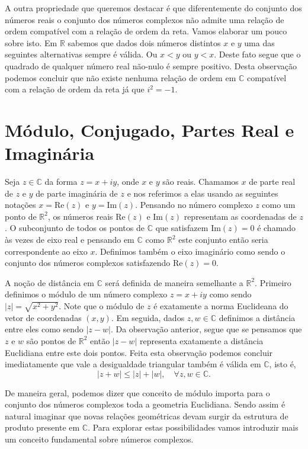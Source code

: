 A outra propriedade que queremos destacar é que diferentemente do conjunto dos números
reais o conjunto dos números complexos não admite uma relação de ordem compatível 
com a relação de ordem da reta. Vamos elaborar um pouco sobre isto. Em $\mathbb{R}$ 
sabemos que dados dois números distintos $x$ e $y$ uma das seguintes alternativas sempre é válida.
Ou $x<y$ ou $y<x$. Deste fato segue que o quadrado de qualquer número real não-nulo é sempre positivo.
Desta observação podemos concluir que não existe nenhuma relação de ordem 
em $\mathbb{C}$ compatível com a relação de ordem da reta já que $i^2=-1$. 


\section{Módulo, Conjugado, Partes Real e Imaginária}

Seja $z\in \mathbb{C}$ da forma $z=x+iy$, onde $x$ e $y$ são reais. 
Chamamos $x$ de parte real de $z$ e $y$ de parte imaginária de $z$ e nos referimos a elas 
usando as seguintes notações $x=\text{Re}(z)$ e $y=\text{Im}(z)$.
Pensando no número complexo $z$ como um ponto de $\mathbb{R}^2$, 
os números reais $\text{Re}(z)$ e $\text{Im}(z)$ representam as coordenadas de $z$.
O subconjunto de todos os pontos de $\mathbb{C}$ que satisfazem $\text{Im}(z)=0$ é
chamado às vezes de eixo real e pensando em $\mathbb{C}$ como $\mathbb{R}^2$
este conjunto então seria correspondente ao eixo $x$. Definimos também o eixo imaginário
como sendo o conjunto dos números complexos satisfazendo $\text{Re}(z)=0$. 

A noção de distância em $\mathbb{C}$ será definida de maneira semelhante a $\mathbb{R}^2$.
Primeiro definimos o módulo
 de um número complexo $z=x+iy$ como sendo $|z|=\sqrt{x^2+y^2}$.
Note que o módulo de $z$ é exatamente a norma Euclideana do vetor de coordenadas $(x,y)$.
Em seguida, dados $z,w\in\mathbb{C}$ definimos a distância entre eles como sendo $|z-w|$.
Da observação anterior, segue que se pensamos que $z$ e $w$ são pontos
de $\mathbb{R}^2$ então $|z-w|$ representa exatamente a distância Euclidiana entre este dois pontos. 
Feita esta observação podemos concluir imediatamente que vale a desigualdade triangular 
também é válida em $\mathbb{C}$, isto é, 
\[
|z+w|\leq |z|+|w|,\quad \forall z,w\in\mathbb{C}.
\]

De maneira geral, podemos dizer que conceito de módulo importa para o conjunto dos números complexos
toda a geometria Euclidiana. Sendo assim é natural imaginar que novas relações geométricas devam surgir
da estrutura de produto presente em $\mathbb{C}$. Para explorar estas possibilidades vamos 
introduzir mais um conceito fundamental sobre números complexos.

